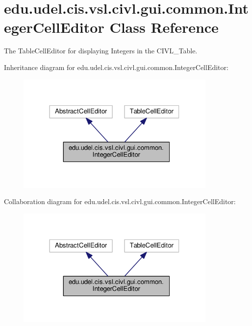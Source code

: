 \hypertarget{classedu_1_1udel_1_1cis_1_1vsl_1_1civl_1_1gui_1_1common_1_1IntegerCellEditor}{}\section{edu.\+udel.\+cis.\+vsl.\+civl.\+gui.\+common.\+Integer\+Cell\+Editor Class Reference}
\label{classedu_1_1udel_1_1cis_1_1vsl_1_1civl_1_1gui_1_1common_1_1IntegerCellEditor}


The Table\+Cell\+Editor for displaying Integers in the C\+I\+V\+L\+\_\+\+Table.  




Inheritance diagram for edu.\+udel.\+cis.\+vsl.\+civl.\+gui.\+common.\+Integer\+Cell\+Editor\+:
\nopagebreak
\begin{figure}[H]
\begin{center}
\leavevmode
\includegraphics[width=278pt]{classedu_1_1udel_1_1cis_1_1vsl_1_1civl_1_1gui_1_1common_1_1IntegerCellEditor__inherit__graph}
\end{center}
\end{figure}


Collaboration diagram for edu.\+udel.\+cis.\+vsl.\+civl.\+gui.\+common.\+Integer\+Cell\+Editor\+:
\nopagebreak
\begin{figure}[H]
\begin{center}
\leavevmode
\includegraphics[width=278pt]{classedu_1_1udel_1_1cis_1_1vsl_1_1civl_1_1gui_1_1common_1_1IntegerCellEditor__coll__graph}
\end{center}
\end{figure}
